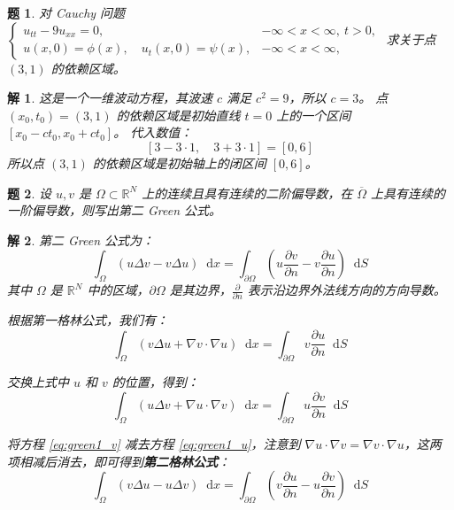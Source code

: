\documentclass[12pt,a4paper]{article}
\newcommand{\diff}{\mathop{}\!\mathrm{d}}  %
\newcommand{\R}{\mathbb{R}}                %
\newtheorem{problem}{题}
\newtheorem*{solution}{解}
\begin{document}
	\begin{problem}
		对 Cauchy 问题
		$
		\begin{cases}
			u_{tt} - 9u_{xx} = 0, & -\infty < x < \infty, \ t > 0, \\
			u(x, 0) = \phi(x), \quad u_t(x, 0) = \psi(x), & -\infty < x < \infty,
		\end{cases}
		$
		求关于点 $(3,1)$ 的依赖区域。
	\end{problem}
	\hrulefill
	\begin{solution}
		这是一个一维波动方程，其波速 $c$ 满足 $c^2=9$，所以 $c=3$。
		点 $(x_0, t_0) = (3, 1)$ 的依赖区域是初始直线 $t=0$ 上的一个区间 $[x_0 - ct_0, x_0 + ct_0]$。
		代入数值：
		\[
		[3 - 3 \cdot 1, \quad 3 + 3 \cdot 1] = [0, 6]
		\]
		所以点 $(3,1)$ 的依赖区域是初始轴上的闭区间 $[0, 6]$。
	\end{solution}
	\hrulefill
	
	\begin{problem}
		设 $u,v$ 是 $\Omega \subset \R^N$ 上的连续且具有连续的二阶偏导数，在 $\overline{\Omega}$ 上具有连续的一阶偏导数，则写出第二 Green 公式。
	\end{problem}
	\hrulefill
	\begin{solution}
		第二 Green 公式为：
		\[
		\int_{\Omega} (u \Delta v - v \Delta u) \diff x = \int_{\partial\Omega} \left(u \frac{\partial v}{\partial n} - v \frac{\partial u}{\partial n}\right) \diff S
		\]
		其中 $\Omega$ 是 $\R^N$ 中的区域，$\partial\Omega$ 是其边界，$\frac{\partial}{\partial n}$ 表示沿边界外法线方向的方向导数。
		
		根据第一格林公式，我们有：
		\begin{equation} \label{eq:green1_v}
			\int_{\Omega} (v \Delta u + \nabla v \cdot \nabla u) \diff x = \int_{\partial\Omega} v \frac{\partial u}{\partial n} \diff S
		\end{equation}
		
		\noindent
		交换上式中 $u$ 和 $v$ 的位置，得到：
		\begin{equation} \label{eq:green1_u}
			\int_{\Omega} (u \Delta v + \nabla u \cdot \nabla v) \diff x = \int_{\partial\Omega} u \frac{\partial v}{\partial n} \diff S
		\end{equation}
		
		\noindent
		将方程 \eqref{eq:green1_v} 减去方程 \eqref{eq:green1_u}，注意到 $\nabla u \cdot \nabla v = \nabla v \cdot \nabla u$，这两项相减后消去，即可得到\textbf{第二格林公式}：
		\[
		\int_{\Omega} (v \Delta u - u \Delta v) \diff x = \int_{\partial\Omega} \left(v \frac{\partial u}{\partial n} - u \frac{\partial v}{\partial n}\right) \diff S
		\]
	\end{solution}
	
\end{document}

